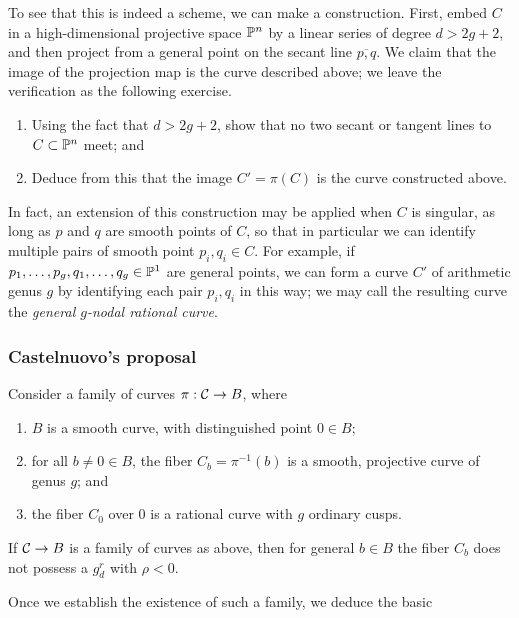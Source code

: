 To see that this is indeed a scheme, we can make a construction. First, embed $C$ in a high-dimensional projective space $\PP^n$ by a linear series of degree $d > 2g+2$, and then project from a general point on the secant line $\overline{p,q}$. We claim that the image of the projection map is the curve described above; we leave the verification as the following exercise.

\begin{exercise}
\begin{enumerate}
\item Using the fact that $d > 2g+2$, show that no two secant or tangent lines to $C \subset \PP^n$ meet; and
\item Deduce from this that the image $C' = \pi(C)$ is the curve constructed above.
\end{enumerate}
\end{exercise}

In fact, an extension of this construction may be applied when $C$ is singular, as long as $p$ and $q$ are smooth points of $C$, so that in particular we can identify multiple pairs of smooth point $p_i, q_i \in C$. For example, if $p_1,\dots,p_g, q_1,\dots, q_g \in \PP^1$ are general points, we can form a curve $C'$ of arithmetic genus $g$ by identifying each pair $p_i, q_i$ in this way; we may call the resulting curve the \emph{general $g$-nodal rational curve}.

\subsubsection{Castelnuovo's proposal}

Consider a family of curves $\pi : \cC \to B$, where
\begin{enumerate}
\item $B$ is a smooth curve, with distinguished point $0 \in B$;
\item for all $b \neq 0 \in B$, the fiber $C_b = \pi^{-1}(b)$ is a smooth, projective curve of genus $g$;  and
\item the fiber $C_0$ over $0$ is a rational curve with $g$ ordinary cusps.
\end{enumerate}

\begin{lemma}\label{BN in family}
If $\cC \to B$ is a family of curves as above, then for general $b \in B$ the fiber $C_b$ does not possess a $g^r_d$ with $\rho < 0$.
\end{lemma}

Once we establish the existence of such a family, we deduce the basic

